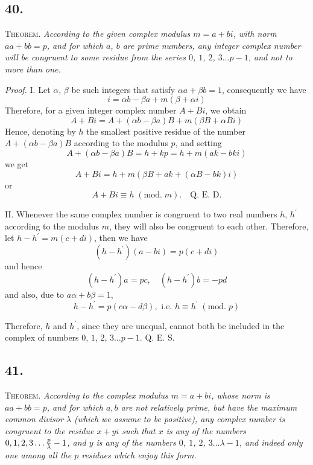 \documentclass[twoside,12pt, showframe]{memoir}
\renewcommand{\pmod}[1]{\;(\textrm{mod.}\;#1)}
\let\oldfrac\frac
\def\frac#1#2{\mathchoice{\tfrac{#1}{#2}}{\oldfrac{#1}{#2}}{\genfrac{}{}{}{2}{#1}{#2\mathstrut}}{\genfrac{}{}{}{3}{#1}{#2\mathstrut}}}
\begin{document}
%

\subsection*{40.}
 
\textsc{Theorem.} \textit{According to the given complex modulus \(m=a+b i\), with norm \(a a+b b=p\), and for which \(a\), \(b\) are prime numbers, any integer complex number will be congruent to some residue from the series \(0\), \(1\), \(2\), \(3 \ldots p-1\), and not to more than one.}
 
\textit{Proof.} I. Let \(\alpha\), \(\beta\) be such integers that satisfy \(\alpha a+\beta b=1\), consequently we have
\[i=\alpha b- \beta a+m(\beta+\alpha i)\]
Therefore, for a given integer complex number \(A+B i\), we obtain
\[A+B i=A+(\alpha b-\beta a) B+m(\beta B+\alpha B i)\]
Hence, denoting by \(h\) the smallest positive residue of the number \(A+(\alpha b-\beta a) B\) according to the modulus \(p\), and setting
\[A+(\alpha b-\beta a) B=h+k p=h+m(a k-b k i)\]
we get
\[A+B i=h+m(\beta B+a k+(\alpha B-b k) i)\]
or
\[A+B i \equiv h\pmod{m} . \quad \text{Q. E. D.}\]
 
II. Whenever the same complex number is congruent to two real numbers \(h\), \(h^{\prime}\) according to the modulus \(m\), they will also be congruent to each other. Therefore, let \(h-h^{\prime}=m(c+d i)\), then we have
\[(h-h^{\prime})(a-b i)=p(c+d i)\]
and hence
\[(h-h^{\prime}) a=p c, \quad (h-h^{\prime}) b=-p d\]
and also, due to \(a \alpha+b \beta=1\),
\[h-h^{\prime}=p(c \alpha-d \beta), \text{ i.e. } h \equiv h^{\prime}\pmod{p}\]
 
Therefore, \(h\) and \(h^{\prime}\), since they are unequal, cannot both be included in the complex of numbers \(0\), \(1\), \(2\), \(3 \ldots p-1\). Q. E. S.
%

\subsection*{41.}

\textsc{Theorem.} \textit{According to the complex modulus \(m=a+b i\), whose norm is \(a a+b b=p\), and for which \(a, b\) are not relatively prime, but have the maximum common divisor \(\lambda\) (which we assume to be positive), any complex number is congruent to the residue \(x+y i\) such that \(x\) is any of the numbers \(0,1,2,3 \ldots \frac{p}{\lambda}-1\), and \(y\) is any of the numbers \(0\), \(1\), \(2\), \(3 \ldots \lambda-1\), and indeed only one among all the \(p\) residues which enjoy this form.}
\end{document}
